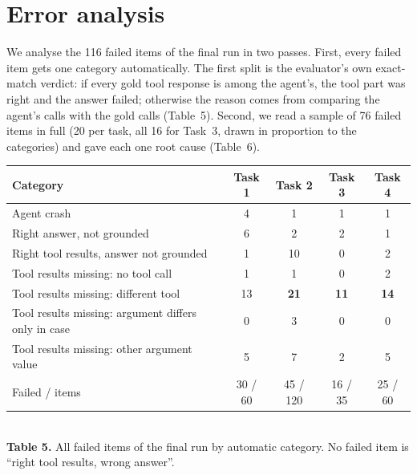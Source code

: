 \documentclass[10pt]{article}
\begin{document}
\section{Error analysis}
We analyse the 116 failed items of the final run in two passes. First, every failed item gets one
category automatically. The first split is the evaluator's own exact-match verdict: if every gold
tool response is among the agent's, the tool part was right and the answer failed; otherwise the
reason comes from comparing the agent's calls with the gold calls (Table~5). Second, we read a
sample of 76 failed items in full (20 per task, all 16 for Task~3, drawn in proportion to the
categories) and gave each one root cause (Table~6).

\begin{center}\small
\begin{tabular}{@{}lcccc@{}}
\toprule
Category & Task 1 & Task 2 & Task 3 & Task 4 \\
\midrule
Agent crash                                         & 4 & 1 & 1 & 1 \\
Right answer, not grounded                          & 6 & 2 & 2 & 1 \\
Right tool results, answer not grounded             & 1 & 10 & 0 & 2 \\
Tool results missing: no tool call                  & 1 & 1 & 0 & 2 \\
Tool results missing: different tool                & 13 & \textbf{21} & \textbf{11} & \textbf{14} \\
Tool results missing: argument differs only in case & 0 & 3 & 0 & 0 \\
Tool results missing: other argument value          & 5 & 7 & 2 & 5 \\
\midrule
Failed / items                                      & 30 / 60 & 45 / 120 & 16 / 35 & 25 / 60 \\
\bottomrule
\end{tabular}\\[0.2em]
{\footnotesize \textbf{Table 5.} All failed items of the final run by automatic category. No failed
item is ``right tool results, wrong answer''.}
\end{center}
\end{document}
